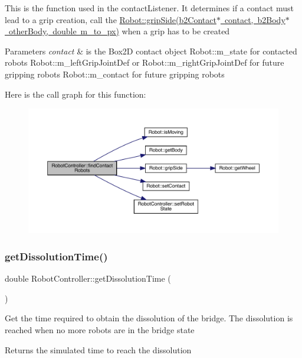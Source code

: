 This is the function used in the contact\+Listener. It determines if a contact must lead to a grip creation, call the \mbox{\hyperlink{class_robot_aed1ba5683c53ac2b7e4a6c3fc7bcadba}{Robot\+::grip\+Side(b2\+Contact$\ast$ contact, b2\+Body$\ast$ other\+Body, double m\+\_\+to\+\_\+px)}} when a grip has to be created 
\begin{DoxyParams}{Parameters}
{\em contact} & is the Box2D contact object  Robot\+::m\+\_\+state for contacted robots  Robot\+::m\+\_\+left\+Grip\+Joint\+Def or Robot\+::m\+\_\+right\+Grip\+Joint\+Def for future gripping robots  Robot\+::m\+\_\+contact for future gripping robots \\
\hline
\end{DoxyParams}
Here is the call graph for this function\+:\nopagebreak
\begin{figure}[H]
\begin{center}
\leavevmode
\includegraphics[width=350pt]{class_robot_controller_a11e413a1ac6466f360f46820d28b0f2e_cgraph}
\end{center}
\end{figure}
\mbox{\label{class_robot_controller_a55f55b2b3b9013bdfc28ad11e0318ce8}} 
\subsubsection{\texorpdfstring{get\+Dissolution\+Time()}{getDissolutionTime()}}
{\footnotesize\ttfamily double Robot\+Controller\+::get\+Dissolution\+Time (\begin{DoxyParamCaption}{ }\end{DoxyParamCaption})}

Get the time required to obtain the dissolution of the bridge. The dissolution is reached when no more robots are in the bridge state \begin{DoxyReturn}{Returns}
the simulated time to reach the dissolution 
\end{DoxyReturn}
\mbox{\label{class_robot_controller_a45a4e25b2bb49bf2f1dc18b0f21a6f8d}} 
